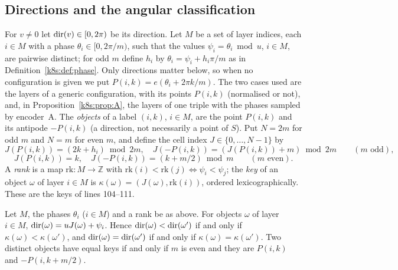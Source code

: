 \subsection{Directions and the angular classification}\label{k8s:sec:angular}

For $v\ne0$ let $\operatorname{dir}(v)\in[0,2\pi)$ be its direction. Let $M$ be a set of layer indices, each $i\in M$ with a phase
$\theta_i\in[0,2\pi/m)$, such that the values $\psi_i=\theta_i\bmod u$, $i\in M$, are pairwise distinct; for odd $m$
define $h_i$ by $\theta_i=\psi_i+h_i\pi/m$ as in Definition~\ref{k8s:def:phase}. Only directions matter below, so when
no configuration is given we put $P(i,k)=e(\theta_i+2\pi k/m)$. The two cases used are the layers of a generic
configuration, with its points $P(i,k)$ (normalised or not), and, in Proposition~\ref{k8s:prop:A}, the layers of one
triple with the phases sampled by encoder~A. The \emph{objects} of a label $(i,k)$, $i\in M$, are the point $P(i,k)$
and its antipode $-P(i,k)$ (a direction, not necessarily a point of $S$). Put
$N=2m$ for odd $m$ and $N=m$ for even $m$, and define the cell index $J\in\{0,\dots,N-1\}$ by
\[
J(P(i,k))=(2k+h_i)\bmod 2m,\quad J(-P(i,k))=(J(P(i,k))+m)\bmod 2m\qquad(m\text{ odd}),
\]
\[
J(P(i,k))=k,\quad J(-P(i,k))=(k+m/2)\bmod m\qquad(m\text{ even}).
\]
A \emph{rank} is a map $\mathrm{rk}:M\to\mathbb Z$
with $\mathrm{rk}(i)<\mathrm{rk}(j)\iff\psi_i<\psi_j$; the \emph{key} of an object $\omega$ of layer $i\in M$ is
$\kappa(\omega)=(J(\omega),\mathrm{rk}(i))$, ordered lexicographically. These are the keys of lines 104--111.

\begin{lemma}\label{k8s:lem:keys}
Let $M$, the phases $\theta_i$ ($i\in M$) and a rank be as above. For objects $\omega$ of layer $i\in M$,
$\operatorname{dir}(\omega)=uJ(\omega)+\psi_i$. Hence $\operatorname{dir}(\omega)<\operatorname{dir}(\omega')$ if and only if
$\kappa(\omega)<\kappa(\omega')$, and $\operatorname{dir}(\omega)=\operatorname{dir}(\omega')$ if and only if $\kappa(\omega)=\kappa(\omega')$. Two
distinct objects have equal keys if and only if $m$ is even and they are $P(i,k)$ and $-P(i,k+m/2)$.
\end{lemma}

